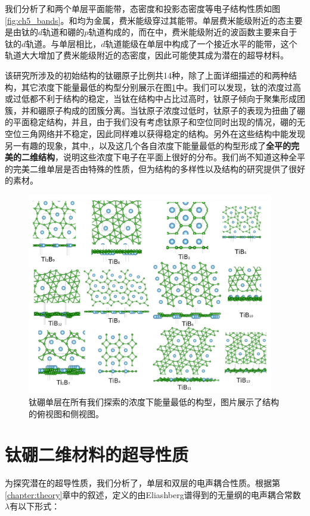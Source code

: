 我们分析了和两个单层平面能带，态密度和投影态密度等电子结构性质如图\ref{fig:ch5_bands}。和均为金属，费米能级穿过其能带。单层费米能级附近的态主要是由钛的$d$轨道和硼的$p$轨道构成的，而在中，费米能级附近的波函数主要来自于钛的$d$轨道。与单层相比，$d$轨道能级在单层中构成了一个接近水平的能带，这个轨道大大增加了费米能级附近的态密度，因此可能使其成为潜在的超导材料。

该研究所涉及的初始结构的钛硼原子比例共\num{14}种，除了上面详细描述的和两种结构，其它浓度下能量最低的构型分别展示在图\ref{fig:ch5_all_configs}中。我们可以发现，钛的浓度过高或过低都不利于结构的稳定，当钛在结构中占比过高时，钛原子倾向于聚集形成团簇，并和硼原子构成的团簇分离。当钛原子浓度过低时，钛原子的表现为扭曲了硼的平面稳定结构，并且，由于我们没有考虑钛原子和空位同时出现的情况，硼的无空位三角网络并不稳定，因此同样难以获得稳定的结构。另外在这些结构中能发现另一有趣的现象，其中,，以及这几个各自浓度下能量最低的构型形成了{\textbf{全平的完美的二维结构}}，说明这些浓度下电子在平面上很好的分布。我们尚不知道这种全平的完美二维单层是否由特殊的性质，但为结构的多样性以及结构的研究提供了很好的素材。

\begin{figure}
  \includegraphics[width=0.96\textwidth]{figs/ch5_all_configs.png}
  \centering
  \caption{钛硼单层在所有我们探索的浓度下能量最低的构型，图片展示了结构的俯视图和侧视图。}
  \label{fig:ch5_all_configs}
\end{figure}

\section{钛硼二维材料的超导性质}
为探究潜在的超导性质，我们分析了，单层和双层的电声耦合性质。根据第\ref{chapter:theory}章中的叙述，定义的由Eliashberg谱得到的无量纲的电声耦合常数$\lambda$有以下形式：

